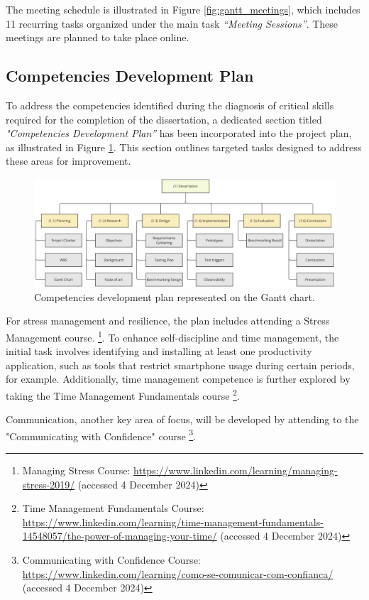 The meeting schedule is illustrated in Figure \ref{fig:gantt_meetings}, which includes 11 recurring tasks organized under the main task \textit{“Meeting Sessions”}. These meetings are planned to take place online.

\subsection{Competencies Development Plan}

To address the competencies identified during the diagnosis of critical skills required for the completion of the dissertation, a dedicated section titled \textit{"Competencies Development Plan”} has been incorporated into the project plan, as illustrated in Figure \ref{fig:gantt_competency}. This section outlines targeted tasks designed to address these areas for improvement.

\begin{figure}
      \centering
      \includegraphics[width=\linewidth]{ch-planning/assets/wbs.png}
      \caption{Competencies development plan represented on the Gantt chart.}
      \label{fig:gantt_competency}
\end{figure}

For stress management and resilience, the plan includes attending a Stress Management course.
\footnote{Managing Stress Course: \url{https://www.linkedin.com/learning/managing-stress-2019/} (accessed 4 December 2024)}. To enhance self-discipline and time management, the initial task involves identifying and installing at least one productivity application, such as tools that restrict smartphone usage during certain periods, for example. Additionally, time management competence is further explored by taking the Time Management Fundamentals course
\footnote{Time Management Fundamentals Course: \url{https://www.linkedin.com/learning/time-management-fundamentals-14548057/the-power-of-managing-your-time/} (accessed 4 December 2024)}.

Communication, another key area of focus, will be developed by attending to the "Communicating with Confidence" course
\footnote{Communicating with Confidence Course: \url{https://www.linkedin.com/learning/como-se-comunicar-com-confianca/} (accessed 4 December 2024)}.

